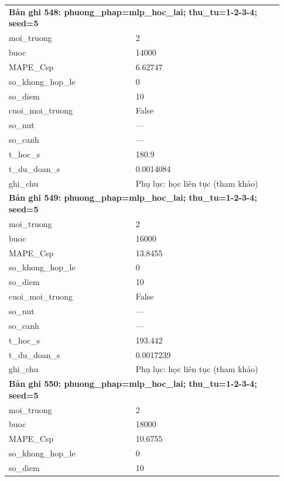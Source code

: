 \begin{longtable}{p{0.43\linewidth}p{0.50\linewidth}}
\midrule
\multicolumn{2}{p{0.95\linewidth}}{\textbf{Bản ghi 548: phuong\_phap=mlp\_hoc\_lai; thu\_tu=1-2-3-4; seed=5}} \\
moi\_\allowbreak truong & 2 \\
buoc & 14000 \\
MAPE\_\allowbreak Csp & 6.62747 \\
so\_\allowbreak khong\_\allowbreak hop\_\allowbreak le & 0 \\
so\_\allowbreak diem & 10 \\
cuoi\_\allowbreak moi\_\allowbreak truong & False \\
so\_\allowbreak nut & — \\
so\_\allowbreak canh & — \\
t\_\allowbreak hoc\_\allowbreak s & 180.9 \\
t\_\allowbreak du\_\allowbreak doan\_\allowbreak s & 0.0014084 \\
ghi\_\allowbreak chu & Phụ lục: học liên tục (tham khảo) \\
\midrule
\multicolumn{2}{p{0.95\linewidth}}{\textbf{Bản ghi 549: phuong\_phap=mlp\_hoc\_lai; thu\_tu=1-2-3-4; seed=5}} \\
moi\_\allowbreak truong & 2 \\
buoc & 16000 \\
MAPE\_\allowbreak Csp & 13.8455 \\
so\_\allowbreak khong\_\allowbreak hop\_\allowbreak le & 0 \\
so\_\allowbreak diem & 10 \\
cuoi\_\allowbreak moi\_\allowbreak truong & False \\
so\_\allowbreak nut & — \\
so\_\allowbreak canh & — \\
t\_\allowbreak hoc\_\allowbreak s & 193.442 \\
t\_\allowbreak du\_\allowbreak doan\_\allowbreak s & 0.0017239 \\
ghi\_\allowbreak chu & Phụ lục: học liên tục (tham khảo) \\
\midrule
\multicolumn{2}{p{0.95\linewidth}}{\textbf{Bản ghi 550: phuong\_phap=mlp\_hoc\_lai; thu\_tu=1-2-3-4; seed=5}} \\
moi\_\allowbreak truong & 2 \\
buoc & 18000 \\
MAPE\_\allowbreak Csp & 10.6755 \\
so\_\allowbreak khong\_\allowbreak hop\_\allowbreak le & 0 \\
so\_\allowbreak diem & 10 \\

\end{longtable}
